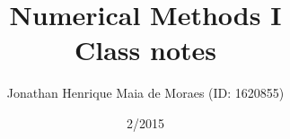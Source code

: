 \title{Numerical Methods I \\ Class notes}
\author{Jonathan Henrique Maia de Moraes (ID: 1620855)}
\date{2/2015}
\maketitle
